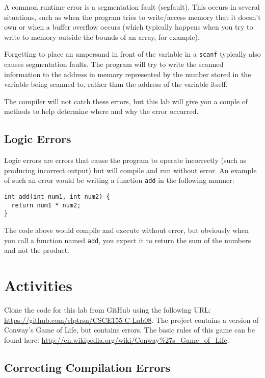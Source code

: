 \documentclass[12pt]{scrartcl}
\begin{document}
A common runtime error is a segmentation fault (segfault).  This occurs in 
several situations, such as when the program tries to write/access memory 
that it doesn't own or when a buffer overflow occurs (which typically happens 
when you try to write to memory outside the bounds of an array, for example).  

Forgetting to place an ampersand in front of the variable in a \texttt{scanf} 
typically also causes segmentation faults.  The program will try to write the 
scanned information to the address in memory represented by the number 
stored in the variable being scanned to, rather than the address of the variable 
itself.  

The compiler will not catch these errors, but this lab will give you a couple of 
methods to help determine where and why the error occurred.  

\subsection*{Logic Errors}

Logic errors are errors that cause the program to operate incorrectly (such 
as producing incorrect output) but will compile and run without error.  An 
example of such an error would be writing a function \texttt{add} 
in the following manner:

\begin{verbatim}
int add(int num1, int num2) {
  return num1 * num2;
}
\end{verbatim}

The code above would compile and execute without error, but obviously 
when you call a function named \texttt{add}, you expect it to return the sum of 
the numbers and not the product.  

\section{Activities}

Clone the code for this lab from GitHub using the following URL: 
\url{https://github.com/clptrsn/CSCE155-C-Lab08}.  The project 
contains a version of Conway's Game of Life, but contains errors.
The basic rules of this game can be found here: 
\url{http://en.wikipedia.org/wiki/Conway%27s_Game_of_Life}.

\subsection{Correcting Compilation Errors}
\end{document}

